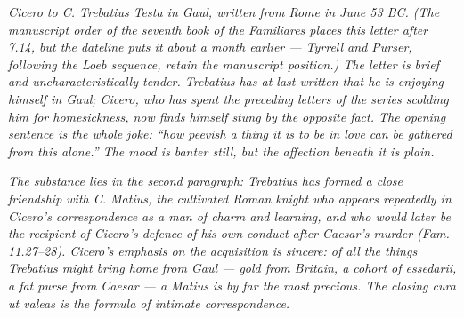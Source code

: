 
\textit{Cicero to C. Trebatius Testa in Gaul, written from Rome
in June 53 BC. (The manuscript order of the seventh book of the
\textit{Familiares} places this letter after 7.14, but the
dateline puts it about a month earlier --- Tyrrell and Purser,
following the Loeb sequence, retain the manuscript position.)
The letter is brief and uncharacteristically tender. Trebatius
has at last written that he is enjoying himself in Gaul; Cicero,
who has spent the preceding letters of the series scolding him
for homesickness, now finds himself stung by the opposite fact.
The opening sentence is the whole joke: ``how peevish a thing it
is to be in love can be gathered from this alone.'' The mood is
banter still, but the affection beneath it is plain.}

\textit{The substance lies in the second paragraph: Trebatius
has formed a close friendship with C. Matius, the cultivated
Roman knight who appears repeatedly in Cicero's correspondence
as a man of charm and learning, and who would later be the
recipient of Cicero's defence of his own conduct after Caesar's
murder (\textit{Fam.} 11.27--28). Cicero's emphasis on the
acquisition is sincere: of all the things Trebatius might bring
home from Gaul --- gold from Britain, a cohort of \textit{essedarii},
a fat purse from Caesar --- a Matius is by far the most precious.
The closing \textit{cura ut valeas} is the formula of intimate
correspondence.}
